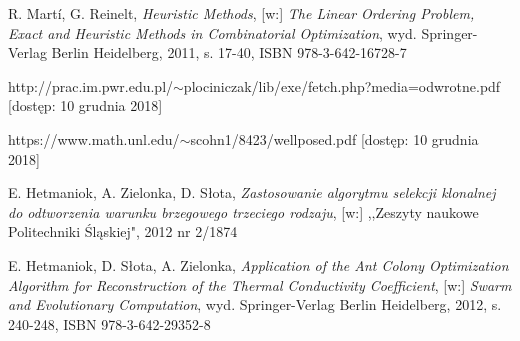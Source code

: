 \documentclass[twoside]{projektInzynierskiMS1}
\begin{document}
\begin{thebibliography}{12}
 R. Martí, G. Reinelt, \textit{Heuristic Methods}, [w:] \textit{The Linear Ordering Problem, Exact and Heuristic Methods in Combinatorial Optimization}, wyd. Springer-Verlag Berlin Heidelberg, 2011, s. 17-40, ISBN 978-3-642-16728-7

 http://prac.im.pwr.edu.pl/$\sim$plociniczak/lib/exe/fetch.php?media=odwrotne.pdf
[dostęp: 10 grudnia 2018]

 https://www.math.unl.edu/$\sim$scohn1/8423/wellposed.pdf
 [dostęp: 10 grudnia 2018]

E. Hetmaniok, A. Zielonka, D. Słota, \textit{Zastosowanie algorytmu selekcji klonalnej do odtworzenia warunku brzegowego trzeciego rodzaju}, [w:] ,,Zeszyty naukowe Politechniki Śląskiej", 2012 nr 2/1874

 E. Hetmaniok, D. Słota, A. Zielonka, \textit{Application of the Ant Colony Optimization Algorithm for Reconstruction of the Thermal Conductivity Coefficient}, [w:] \textit{Swarm and Evolutionary Computation}, wyd. Springer-Verlag Berlin Heidelberg,  2012,  s. 240-248, ISBN 978-3-642-29352-8


\end{thebibliography}
\end{document}
